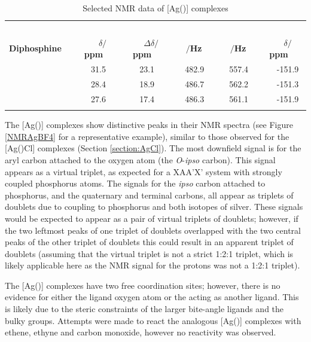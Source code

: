 \begin{table}[h]
\caption[Selected NMR data of [Ag(\tBuxantphos){]} complexes]{Selected NMR data of [Ag(\tBuxantphos){]} complexes} 
\vspace{1em}
\label{table:silverBF4}
\small
\begin{center}
\begin{tabular}{l c c c c c}
	\toprule{}
	~ & \multicolumn{4}{c}{\bfseries{\phosphorus}} & \bfseries{\fluorine} \\
	\cmidrule(lr){2-5} \cmidrule(lr){6-6}
	\bfseries{Diphosphine}~~&~~\bfseries{$\delta/$ppm}~~&~~\bfseries{$\Delta\delta/$ ppm}~~&~~\bfseries{\JAgPseven{}$/$Hz}~~&~~\bfseries{\JAgPnine{}$/$Hz}~~&~~\bfseries{$\delta/$ppm}~~\\
	\midrule
	\tBuSixantphos 	&~~31.5~~&~~23.1~~&~~482.9~~&~~557.4~~&~~-151.9\\ 
	\tBuThixantphos	&~~28.4~~&~~18.9~~&~~486.7~~&~~562.2~~&~~-151.3\\
	\tBuXantphos		&~~27.6~~&~~17.4~~&~~486.3~~&~~561.1~~&~~-151.9\\
	\bottomrule{}
\end{tabular}
\end{center}
\end{table}

The [Ag(\tBuxantphos)] complexes show distinctive peaks in their \carbon{} NMR spectra (see Figure \ref{NMRAgBF4} for a representative example), similar to those observed for the [Ag(\tBuxantphos)Cl] complexes (Section \ref{section:AgCl}).  The most downfield signal is for the aryl carbon attached to the oxygen atom (the \emph{O}-\emph{ipso} carbon).  This signal appears as a virtual triplet, as expected for a XAA'X' system with strongly coupled phosphorus atoms.  The signals for the \emph{ipso} carbon attached to phosphorus, and the \tBu{} quaternary and terminal carbons, all appear as triplets of doublets due to coupling to phosphorus and both isotopes of silver.  These signals would be expected to appear as a pair of virtual triplets of doublets; however, if the two leftmost peaks of one triplet of doublets overlapped with the two central peaks of the other triplet of doublets this could result in an apparent triplet of doublets (assuming that the virtual triplet is not a strict 1:2:1 triplet, which is likely applicable here as the \proton{} NMR signal for the \tBu{} protons was not a 1:2:1 triplet).

The [Ag(\tBuxantphos)] complexes have two free coordination sites; however, there is no evidence for either the ligand oxygen atom or the  acting as another ligand.  This is likely due to the steric constraints of the larger bite-angle ligands and the bulky \tBu{} groups.  Attempts were made to react the analogous [Ag(\tBuxantphos)] complexes with ethene, ethyne and carbon monoxide, however no reactivity was observed.\cite{Bill306}

